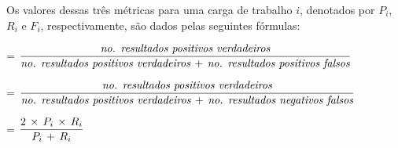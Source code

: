 \documentclass[12pt]{article}
\begin{document}
Os valores dessas três métricas para uma carga de trabalho $i$, denotados por $P_{i}$, $R_{i}$ e $F_{i}$, respectivamente, são dados pelas seguintes fórmulas:

\begin{description}
\scriptsize
  \item[$P_{i}$] = $\dfrac{\emph{no. resultados positivos verdadeiros}}{\emph{no. resultados positivos verdadeiros}\,+\,\emph{no. resultados positivos falsos}}$
  \smallskip
  \item[$R_{i}$] = $\dfrac{\emph{no. resultados positivos verdadeiros}}{\emph{no. resultados positivos verdadeiros}\,+\,\emph{no. resultados negativos falsos}}$
  \smallskip
  \item[$F_{i}$] = $\dfrac{2\,\times\,\emph{$P_{i}$}\,\times\,\emph{$R_{i}$}}{\emph{$P_{i}$}\,+\,\emph{$R_{i}$} }$
\end{description}

%
%
\end{document}
